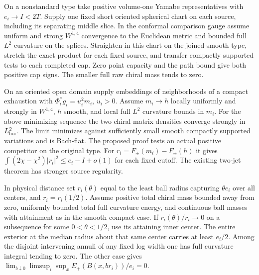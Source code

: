 \begin{proposition}
\label{prop:master-short-cut}
On a nonstandard type take positive volume-one Yamabe representatives
with \(e_i\to I<2T\). Supply one fixed short oriented spherical chart
on each source, including its separating middle slice. In the conformal
comparison gauge assume uniform and strong \(W^{1,4}\) convergence to
the Euclidean metric and bounded full \(L^2\) curvature on the splices.
Straighten in this chart on the joined smooth type, stretch the exact
product for each fixed source, and transfer compactly supported tests
to each completed cap. Zero point capacity and the path bound give both
positive cap signs. The smaller full raw chiral mass tends to zero.
\end{proposition}

\begin{theorem}
\label{thm:master-local-replacement}
On an oriented open domain supply embeddings of neighborhoods of a
compact exhaustion with \(\Phi_i^*g_i=u_i^2m_i\), \(u_i>0\).
Assume \(m_i\to h\) locally uniformly and strongly in \(W^{1,4}\),
\(h\) smooth, and local full \(L^2\) curvature bounds in \(m_i\).
For the above minimizing sequence the two chiral matrix densities
converge strongly in \(L^2_{\rm loc}\). The limit minimizes against
sufficiently small smooth compactly supported variations and is
Bach-flat. The proposed proof tests an actual positive competitor on
the original type. For \(r_i=F_\pm(m_i)-F_\pm(h)\) it gives
\(\int(2\chi-\chi^2)|r_i|^2\le e_i-I+o(1)\) for each fixed cutoff.
The existing two-jet theorem has stronger source regularity.
\end{theorem}

\begin{lemma}
\label{lem:master-quantiles}
In physical distance set \(r_i(\theta)\) equal to the least ball radius
capturing \(\theta e_i\) over all centers, and \(r_i=r_i(1/2)\).
Assume positive total chiral mass bounded away from zero, uniformly
bounded total full curvature energy, and continuous ball masses with
attainment as in the smooth compact case. If
\(r_i(\theta)/r_i\to0\) on a subsequence for some \(0<\theta<1/2\),
use its attaining inner center. The entire exterior at the median
radius about that same center carries at least \(e_i/2\). Among the
disjoint intervening annuli of any fixed log width one has full
curvature integral tending to zero. The other case gives
\(\lim_{b\downarrow0}\limsup_i\sup_x E_+(B(x,b r_i))/e_i=0\).
\end{lemma}

